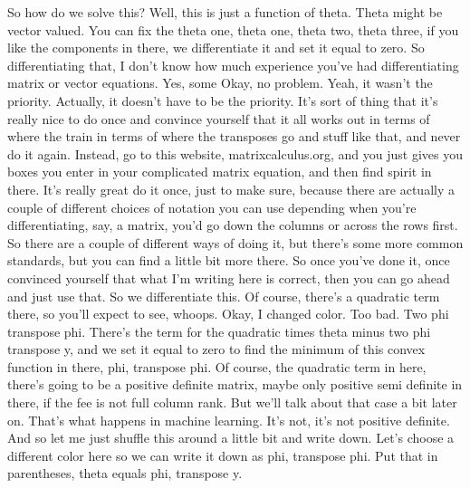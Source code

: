 \documentclass[11pt,a4paper]{article}
\begin{document}
So how do we solve this? Well, this is just a function of theta. Theta might be vector valued. You can fix the theta one, theta one, theta two, theta three, if you like the components in there, we differentiate it and set it equal to zero. So differentiating that, I don't know how much experience you've had differentiating matrix or vector equations. Yes, some Okay, no problem. Yeah, it wasn't the priority. Actually, it doesn't have to be the priority. It's sort of thing that it's really nice to do once and convince yourself that it all works out in terms of where the train in terms of where the transposes go and stuff like that, and never do it again. Instead, go to this website, matrixcalculus.org, and you just gives you boxes you enter in your complicated matrix equation, and then find spirit in there. It's really great do it once, just to make sure, because there are actually a couple of different choices of notation you can use depending when you're differentiating, say, a matrix, you'd go down the columns or across the rows first. So there are a couple of different ways of doing it, but there's some more common standards, but you can find a little bit more there. So once you've done it, once convinced yourself that what I'm writing here is correct, then you can go ahead and just use that. So we differentiate this. Of course, there's a quadratic term there, so you'll expect to see, whoops. Okay, I changed color. Too bad. Two phi transpose phi. There's the term for the quadratic times theta minus two phi transpose y, and we set it equal to zero to find the minimum of this convex function in there, phi, transpose phi. Of course, the quadratic term in here, there's going to be a positive definite matrix, maybe only positive semi definite in there, if the fee is not full column rank. But we'll talk about that case a bit later on. That's what happens in machine learning. It's not, it's not positive definite. And so let me just shuffle this around a little bit and write down. Let's choose a different color here so we can write it down as phi, transpose phi. Put that in parentheses, theta equals phi, transpose y.
\end{document}
